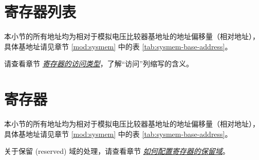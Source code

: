 \documentclass[main\_\_CN.tex]{subfiles}
\begin{document}


\newpage
\hypertarget{anacom-reg-summ}{}
\section{寄存器列表}
\label{sec:anacom-reg-summ}

本小节的所有地址均为相对于模拟电压比较器基地址的地址偏移量（相对地址），具体基地址请见章节 \ref{mod:sysmem} \textit{} 中的表 \ref{tab:sysmem-base-address}。

请查看章节 \hyperref[glossary-access-types]{\textit{寄存器的访问类型}}，了解“访问”列缩写的含义。








\newpage
\section{寄存器}

本小节的所有地址均为相对于模拟电压比较器基地址的地址偏移量（相对地址），具体基地址请见章节 \ref{mod:sysmem} \textit{} 中的表 \ref{tab:sysmem-base-address}。

关于保留 (reserved) 域的处理，请查看章节 \hyperref[programming-reserved-field]{\textit{如何配置寄存器的保留域}}。



\end{document}

